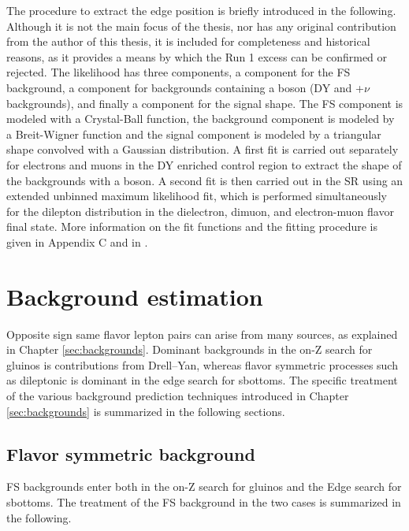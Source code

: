 The procedure to extract the edge position is briefly introduced in the following. 
Although it is not the main focus of the thesis, nor has any original contribution from the author of this thesis, it is included for completeness and historical reasons, as it provides a means by which the Run 1 excess can be confirmed or rejected.   
\newpara
\noindent\justify
The likelihood has three components, a component for the FS background, a component for backgrounds containing a \PZ boson (DY and \PZ+$\nu$ backgrounds), and finally a component for the signal shape.
The FS component is modeled with a Crystal-Ball function, the \PZ background component is modeled by a Breit-Wigner function and the signal component is modeled by a triangular shape convolved with a Gaussian distribution. 
A first fit is carried out separately for electrons and muons in the DY enriched control region to extract the shape of the backgrounds with a \PZ boson. 
A second fit is then carried out in the SR using an extended unbinned maximum likelihood fit, which is performed simultaneously for the dilepton \mll distribution in the dielectron, dimuon, and electron-muon flavor final state. 
More information on the fit functions and the fitting procedure is given in Appendix C and in \cite{Sirunyan:2017qaj}.  
\section{Background estimation}
\noindent
\justify
Opposite sign same flavor lepton pairs can arise from many sources, as explained in Chapter \ref{sec:backgrounds}. 
Dominant backgrounds in the on-Z search for gluinos is contributions from Drell--Yan, whereas flavor symmetric processes such as dileptonic \ttbar is dominant in the edge search for sbottoms. 
The specific treatment of the various background prediction techniques introduced in Chapter \ref{sec:backgrounds} is summarized in the following sections. 
\subsection*{Flavor symmetric background}\label{sec:fsstrong}
\noindent\justify
FS backgrounds enter both in the on-Z search for gluinos and the Edge search for sbottoms. The treatment of the FS background in the two cases is summarized in the following. 
